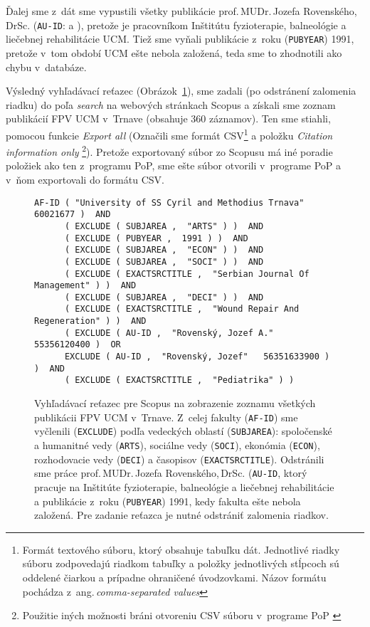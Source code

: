 Ďalej sme z~dát sme vypustili všetky publikácie prof.\,MUDr.\,Jozefa
Rovenského,\,DrSc.  (\texttt{AU-ID}:  a ), pretože je pracovníkom Inštitútu fyzioterapie, balneológie a
liečebnej rehabilitácie UCM.  Tiež sme vyňali publikácie z~roku
(\texttt{PUBYEAR}) 1991, pretože v~tom období UCM ešte nebola založená, teda sme
to zhodnotili ako chybu v~databáze.

Výsledný vyhľadávací reťazec (Obrázok~\ref{fig:scopus.query}), sme zadali (po
odstránení zalomenia riadku) do poľa \emph{search} na webových stránkach Scopus
a získali sme zoznam publikácií FPV UCM v~Trnave (obsahuje 360 záznamov).  Ten
sme stiahli, pomocou funkcie \emph{Export all} (Označili sme formát
CSV\footnote{Formát textového súboru, ktorý obsahuje tabuľku dát.  Jednotlivé
  riadky súboru zodpovedajú riadkom tabuľky a položky jednotlivých stĺpcoch sú
  oddelené čiarkou a prípadne ohraničené úvodzovkami.  Názov formátu pochádza
  z~ang.\,\emph{comma-separated values}} a položku \emph{Citation information
  only} \footnote {Použitie iných možnosti bráni otvoreniu CSV súboru v~programe
  PoP \citep{Harzing2011}}).  Pretože exportovaný súbor zo Scopusu má iné
poradie položiek ako ten z~programu PoP, sme ešte súbor otvorili v~programe PoP
a v~ňom exportovali do formátu CSV.


\begin{figure}
  \footnotesize
  \begin{Verbatim}[frame=single]
    AF-ID ( "University of SS Cyril and Methodius Trnava"   60021677 )  AND
      ( EXCLUDE ( SUBJAREA ,  "ARTS" ) )  AND
      ( EXCLUDE ( PUBYEAR ,  1991 ) )  AND
      ( EXCLUDE ( SUBJAREA ,  "ECON" ) )  AND
      ( EXCLUDE ( SUBJAREA ,  "SOCI" ) )  AND
      ( EXCLUDE ( EXACTSRCTITLE ,  "Serbian Journal Of Management" ) )  AND
      ( EXCLUDE ( SUBJAREA ,  "DECI" ) )  AND
      ( EXCLUDE ( EXACTSRCTITLE ,  "Wound Repair And Regeneration" ) )  AND
      ( EXCLUDE ( AU-ID ,  "Rovenský, Jozef A."   55356120400 )  OR
      EXCLUDE ( AU-ID ,  "Rovenský, Jozef"   56351633900 ) )  AND
      ( EXCLUDE ( EXACTSRCTITLE ,  "Pediatrika" ) )
  \end{Verbatim}
  \vspace*{-4mm}
  \caption[Vyhľadávací reťazec pre celú fakultu pre Scopus]%
  {Vyhľadávací reťazec pre Scopus na zobrazenie zoznamu všetkých publikácii FPV
    UCM v~Trnave.  Z~celej fakulty (\texttt{AF-ID}) sme vyčlenili
    (\texttt{EXCLUDE}) podľa vedeckých oblastí (\texttt{SUBJAREA}): spoločenské
    a humanitné vedy (\texttt{ARTS}), sociálne vedy (\texttt{SOCI}), ekonómia
    (\texttt{ECON}), rozhodovacie vedy (\texttt{DECI}) a časopisov
    (\texttt{EXACTSRCTITLE}).  Odstránili sme práce prof.\,MUDr.\,Jozefa
    Rovenského,\,DrSc.  (\texttt{AU-ID}, ktorý pracuje na Inštitúte
    fyzioterapie, balneológie a liečebnej rehabilitácie a publikácie z~roku
    (\texttt{PUBYEAR}) 1991, kedy fakulta ešte nebola založená.  Pre zadanie
    reťazca je nutné odstrániť zalomenia riadkov.}
  \label{fig:scopus.query}
\end{figure}


